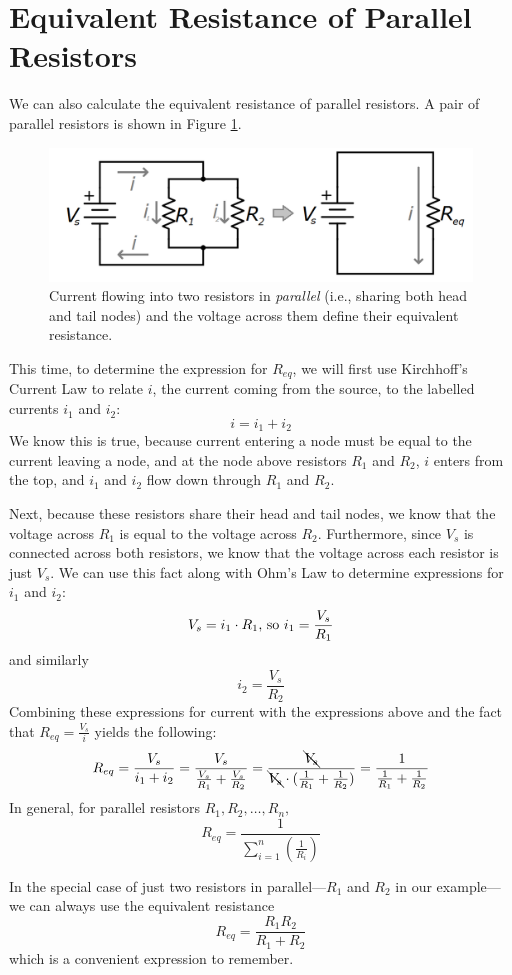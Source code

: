 \section{Equivalent Resistance of Parallel Resistors}
\label{sec:parallelResistors}
We can also calculate the equivalent resistance of parallel resistors. A pair of parallel resistors is shown in Figure \ref{twoParallelToEquivalent}. 
\begin{figure}[h!]
\centering
\includegraphics[width=13cm]{figures/twoResParallel.png}
\caption{Current flowing into two resistors in \textit{parallel} (i.e., sharing both head and tail nodes) and the voltage across them define their equivalent resistance.}
\label{twoParallelToEquivalent}
\end{figure}
This time, to determine the expression for $R_{eq}$, we will first use Kirchhoff's Current Law to relate $i$, the current coming from the source, to the labelled currents $i_1$ and $i_2$: 
$$i = i_1 + i_2$$
We know this is true, because current entering a node must be equal to the current leaving a node, and at the node above resistors $R_1$ and $R_2$, $i$ enters from the top, and $i_1$ and $i_2$ flow down through $R_1$ and $R_2$.
\par
Next, because these resistors share their head and tail nodes, we know that the voltage across $R_1$ is equal to the voltage across $R_2$. Furthermore, since $V_s$ is connected across both resistors, we know that the voltage across each resistor is just $V_s$. We can use this fact along with Ohm's Law to determine expressions for $i_1$ and $i_2$:
$$
V_s = i_1\cdot R_1\textnormal{, so   }i_1 = \frac{V_s}{R_1}
$$
and similarly
$$
i_2 = \frac{V_s}{R_2}
$$
Combining these expressions for current with  the expressions above and the fact that $R_{eq} = \frac{V_s}{i}$ yields the following:
$$
R_{eq} = \frac{V_s}{i_1 + i_2} = \frac{V_s}{\frac{V_s}{R_1} + \frac{V_s}{R_2}} = \frac{\bcancel{V_s}}{\bcancel{V_s}\cdot(\frac{1}{R_1} + \frac{1}{R_2})} = \frac{1}{\frac{1}{R_1} + \frac{1}{R_2}}
$$
In general, for parallel resistors $ R_1, R_2,\dots, R_n,$ 
$$
R_{eq} = \frac{1}{\displaystyle\sum_{i=1}^n{\left(\frac{1}{R_i}\right)}}
$$
\par
In the special case of just two resistors in parallel---$R_1$ and $R_2$ in our example---we can always use the equivalent resistance
$$
R_{eq} = \frac{R_1R_2}{R_1+R_2}
$$
which is a convenient expression to remember.

